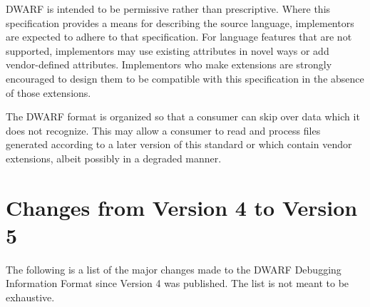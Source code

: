 DWARF is intended to be permissive rather than
prescriptive. 
Where this specification provides a means for
describing the source language, implementors are expected
to adhere to that specification. 
For language features that
are not supported, implementors may use existing attributes
in novel ways or add vendor-defined attributes. 
Implementors
who make extensions are strongly encouraged to design them
to be compatible with this specification in the absence of
those extensions.

The DWARF format is organized so that a consumer can skip over
data which it does not recognize. 
This may allow a consumer
to read and process files generated according to a later
version of this standard or which contain vendor extensions,
albeit possibly in a degraded manner.

\section{Changes from Version 4 to Version 5}
The following is a list of the major changes made to the DWARF Debugging Information
Format since Version 4 was published. The list is not meant to be exhaustive.
